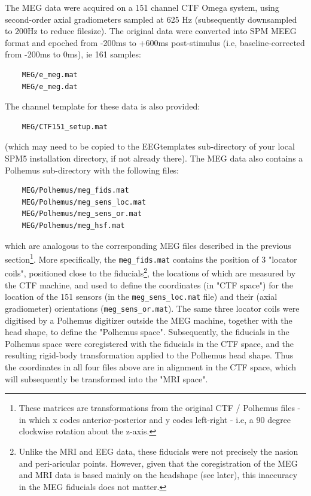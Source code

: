 The MEG data were acquired on a 151 channel CTF Omega system, using second-order axial gradiometers sampled at 625 Hz (subsequently downsampled to 200Hz to reduce filesize).  The original data were converted into SPM MEEG format and epoched from -200ms to +600ms post-stimulus (i.e, baseline-corrected from -200ms to 0ms), ie 161 samples:
\begin{verbatim}
	MEG/e_meg.mat
	MEG/e_meg.dat
\end{verbatim}
The channel template for these data is also provided:
\begin{verbatim}
	MEG/CTF151_setup.mat
\end{verbatim}
(which may need to be copied to the EEGtemplates sub-directory of your local SPM5 installation directory, if not already there).
The MEG data also contains a Polhemus sub-directory with the following files:
\begin{verbatim}
	MEG/Polhemus/meg_fids.mat
	MEG/Polhemus/meg_sens_loc.mat
	MEG/Polhemus/meg_sens_or.mat
	MEG/Polhemus/meg_hsf.mat
\end{verbatim}
which are analogous to the corresponding MEG files described in the previous section\footnote{These matrices are transformations from the original CTF / Polhemus files - in which x codes anterior-posterior and y codes left-right - i.e, a 90 degree clockwise rotation about the z-axis.}. More specifically, the \verb!meg_fids.mat! contains the position of 3 "locator coils", positioned close to the fiducials\footnote{Unlike the MRI and EEG data, these fiducials were not precisely the nasion and peri-aricular points. However, given that the coregistration of the MEG and MRI data is based mainly on the headshape (see later), this inaccuracy in the MEG fiducials does not matter.}, the locations of which are measured by the CTF machine, and used to define the coordinates (in "CTF space") for the location of the 151 sensors (in the \verb!meg_sens_loc.mat! file) and their (axial gradiometer) orientations (\verb!meg_sens_or.mat!). The same three locator coils were digitised by a Polhemus digitizer outside the MEG machine, together with the head shape, to define the "Polhemus space". Subsequently, the fiducials in the Polhemus space were coregistered with the fiducials in the CTF space, and the resulting rigid-body transformation applied to the Polhemus head shape. Thus the coordinates in all four files above are in alignment in the CTF space, which will subsequently be transformed into the "MRI space".



